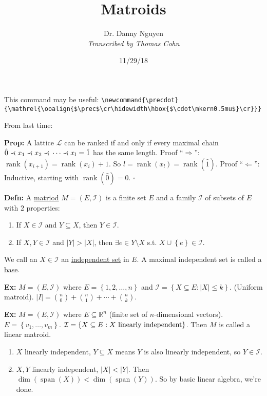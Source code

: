 \documentclass[10pt,letterpaper]{article}
\author{Dr. Danny Nguyen\\ \small\textit{Transcribed by Thomas Cohn}}
\title{Matroids}
\date{11/29/18} %
\newcommand{\n}{\hfill\break}
\newcommand{\up}{\vspace{-\baselineskip}}
\newcommand{\defn}[1]{\par\noindent\settowidth{\hangindent}{\textbf{Defn: }}\textbf{Defn: }#1\n}
\newcommand{\prop}[1]{\par\noindent\settowidth{\hangindent}{\textbf{Prop: }}\textbf{Prop: }#1\n}
\newcommand{\ex}[1]{\par\noindent\settowidth{\hangindent}{\textbf{Ex: }}\textbf{Ex: }#1\n}
\newcommand{\proven}{\;$\square$\n}
\newcommand{\ptxt}[1]{\textrm{\textnormal{#1}}}
\newcommand{\card}[1]{\left|#1\right|}
\newcommand{\set}[1]{\left\{#1\right\}}
\newcommand{\reals}{\mathbb{R}}
\newcommand{\R}{\reals}
\newcommand{\precdot}{\mathrel{\ooalign{$\prec$\cr\hidewidth\hbox{$\cdot\mkern0.5mu$}\cr}}}
\DeclareMathOperator{\vspan}{span}
\DeclareMathOperator{\rank}{rank}
\newcommand{\st}{s.t.}
\begin{document}
\maketitle
\setlength\RaggedRightParindent{\parindent}
\RaggedRight

\par\noindent This command may be useful:\n
\verb|\newcommand{\precdot}{\mathrel{\ooalign{$\prec$\cr\hidewidth\hbox{$\cdot\mkern0.5mu$}\cr}}}|

\par\noindent\n
From last time:
\prop{A lattice $\mathcal{L}$ can be ranked if and only if every maximal chain $\hat{0}\precdot{}x_{1}\precdot{}x_{2}\precdot{}\cdots\precdot{}x_{l}=\hat{1}$ has the same length.\n
Proof ``$\Rightarrow$'': $\rank(x_{i+1})=\rank(x_{i})+1$. So $l=\rank(x_{l})=\rank(\hat{1})$.\n
Proof ``$\Leftarrow$'': Inductive, starting with $\rank(\hat{0})=0$.\n
\proven}

\defn{A \underline{matriod} $M=(E,\mathcal{I})$ is a finite set $E$ and a family $\mathcal{I}$ of subsets of $E$ with $2$ properties:
\begin{enumerate}[label=M\arabic*),start=0]
	\item If $X\in\mathcal{I}$ and $Y\subseteq{}X$, then $Y\in\mathcal{I}$.
	\item If $X,Y\in\mathcal{I}$ and $\card{Y}>\card{X}$, then $\exists{}e\in{}Y\setminus{}X$ \st{} $X\cup\set{e}\in\mathcal{I}$.
\end{enumerate}\up\n
We call an $X\in\mathcal{I}$ an \underline{independent set} in $E$. A maximal independent set is called a \underline{base}.}

\ex{$M=(E,\mathcal{I})$ where $E=\set{1,2,\ldots,n}$ and $\mathcal{I}=\set{X\subseteq{}E:\card{X}\le{}k}$. (Uniform matroid).\n
$\card{I}=\binom{n}{0}+\binom{n}{1}+\cdots+\binom{n}{k}$.}

\ex{$M=(E,\mathcal{I})$ where $E\subseteq\R^{n}$ (finite set of $n$-dimensional vectors). $E=\set{v_{1},\ldots,v_{m}}$.\n
$\mathcal{I}=\set{X\subseteq{}E:X\ptxt{ linearly independent}}$. Then $M$ is called a linear matroid.
\begin{enumerate}[label=M\arabic*), start=0]
	\item $X$ linearly independent, $Y\subseteq{}X$ means $Y$ is also linearly independent, so $Y\in\mathcal{I}$.
	\item $X,Y$ linearly independent, $\card{X}<\card{Y}$. Then $\dim(\vspan(X))<\dim(\vspan(Y))$. So by basic linear algebra, we're done.
\end{enumerate}
\up}
\end{document}
